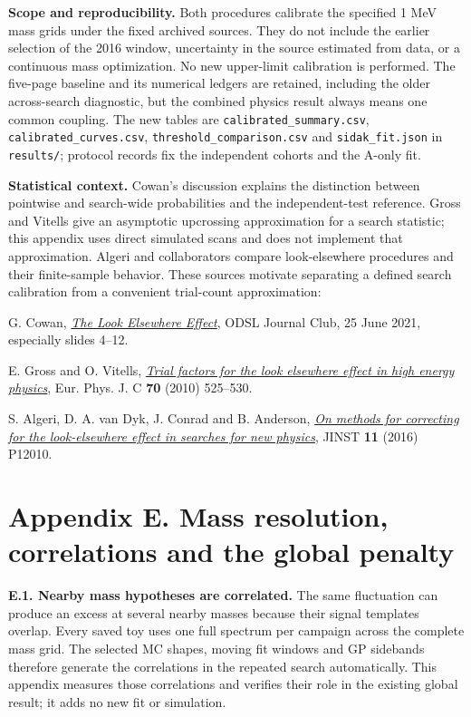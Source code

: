 \documentclass[11pt]{article}
\begin{document}
\textbf{Scope and reproducibility.} Both procedures calibrate the specified 1 MeV mass grids under the fixed archived sources. They do not include the earlier selection of the 2016 window, uncertainty in the source estimated from data, or a continuous mass optimization. No new upper-limit calibration is performed. The five-page baseline and its numerical ledgers are retained, including the older across-search diagnostic, but the combined physics result always means one common coupling. The new tables are \texttt{calibrated\_summary.csv}, \texttt{calibrated\_curves.csv}, \texttt{threshold\_comparison.csv} and \texttt{sidak\_fit.json} in \texttt{results/}; protocol records fix the independent cohorts and the A-only fit.

\textbf{Statistical context.} Cowan's discussion explains the distinction between pointwise and search-wide probabilities and the independent-test reference. Gross and Vitells give an asymptotic upcrossing approximation for a search statistic; this appendix uses direct simulated scans and does not implement that approximation. Algeri and collaborators compare look-elsewhere procedures and their finite-sample behavior. These sources motivate separating a defined search calibration from a convenient trial-count approximation:

{\small
G. Cowan, \href{https://www.pp.rhul.ac.uk/~cowan/stat/cowan_lee_25jun21.pdf}{\emph{The Look Elsewhere Effect}}, ODSL Journal Club, 25 June 2021, especially slides 4--12.\par
E. Gross and O. Vitells, \href{https://arxiv.org/abs/1005.1891}{\emph{Trial factors for the look elsewhere effect in high energy physics}}, Eur. Phys. J. C \textbf{70} (2010) 525--530.\par
S. Algeri, D. A. van Dyk, J. Conrad and B. Anderson, \href{https://arxiv.org/abs/1602.03765}{\emph{On methods for correcting for the look-elsewhere effect in searches for new physics}}, JINST \textbf{11} (2016) P12010.\par}

\clearpage\section*{Appendix E. Mass resolution, correlations and the global penalty}

\textbf{E.1. Nearby mass hypotheses are correlated.} The same fluctuation can produce an excess at several nearby masses because their signal templates overlap. Every saved toy uses one full spectrum per campaign across the complete mass grid. The selected MC shapes, moving fit windows and GP sidebands therefore generate the correlations in the repeated search automatically. This appendix measures those correlations and verifies their role in the existing global result; it adds no new fit or simulation.
\end{document}

